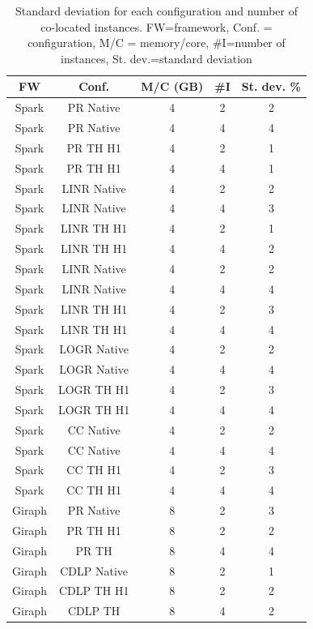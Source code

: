 \begin{table}[thbp]
  \centering
  \caption{Standard deviation for each configuration and number of co-located instances.
	FW=framework, Conf. = configuration, M/C = memory/core, #I=number of instances, St. dev.=standard deviation}
  \label{tab:std-dev}
  \begin{tabular}{|c|c|c|c|c|}
    \hline
	  \textbf{FW} & \textbf{Conf.} & \textbf{M/C (GB)} & \textbf{\#I} & \textbf{St. dev. \%} \\
    \hline
	  Spark & PR Native & 4 & 2 & 2\\
	  Spark & PR Native & 4 & 4 & 4\\
	  Spark & PR TH H1 & 4 & 2 & 1 \\
	  Spark & PR TH H1 & 4 & 4 & 1 \\
	  Spark & LINR Native & 4 & 2 & 2 \\
	  Spark & LINR Native & 4 & 4 & 3 \\
	  Spark & LINR TH H1 & 4 & 2 & 1 \\
	  Spark & LINR TH H1 & 4 & 4 & 2 \\
	  Spark & LINR Native & 4 & 2 & 2 \\
	  Spark & LINR Native & 4 & 4 & 4 \\
	  Spark & LINR TH H1 & 4 & 2 & 3 \\
	  Spark & LINR TH H1 & 4 & 4 & 4 \\
	  Spark & LOGR Native & 4 & 2 & 2 \\
	  Spark & LOGR Native & 4 & 4 & 4 \\
	  Spark & LOGR TH H1 & 4 & 2 & 3 \\
	  Spark & LOGR TH H1 & 4 & 4 & 4 \\ 
	  Spark & CC Native & 4 & 2 & 2 \\
	  Spark & CC Native & 4 & 4 & 4 \\
	  Spark & CC TH H1 & 4 & 2 & 3 \\
	  Spark & CC TH H1 & 4 & 4 & 4 \\ 
	  Giraph & PR Native & 8 & 2 & 3 \\
	  Giraph & PR TH H1 & 8 & 2 & 2 \\
	  Giraph & PR TH & 8 & 4 & 4 \\
	  Giraph & CDLP Native & 8 & 2 & 1 \\
	  Giraph & CDLP TH H1 & 8 & 2 & 2 \\
	  Giraph & CDLP TH & 8 & 4 & 2 \\

    \hline
  \end{tabular}
\end{table}

